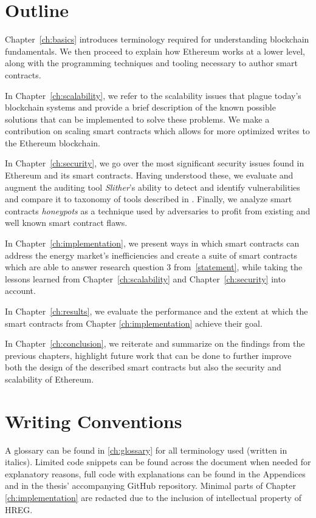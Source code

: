 \section{Outline}

Chapter~\ref{ch:basics} introduces terminology required for understanding blockchain fundamentals. We then proceed to explain how Ethereum works at a lower level, along with the programming techniques and tooling necessary to author smart contracts.

In Chapter~\ref{ch:scalability}, we refer to the scalability issues that plague today's blockchain systems and provide a brief description of the known possible solutions that can be implemented to solve these problems. We make a contribution on scaling smart contracts which allows for more optimized writes to the Ethereum blockchain.

In Chapter~\ref{ch:security}, we go over the most significant security issues found in Ethereum and its smart contracts. Having understood these, we evaluate and augment the auditing tool \textit{Slither}'s ability to detect and identify vulnerabilities and compare it to taxonomy of tools described in \cite{tools}. Finally, we analyze smart contracts \textit{honeypots} as a technique used by adversaries to profit from existing and well known smart contract flaws.

In Chapter~\ref{ch:implementation}, we present ways in which smart contracts can address the energy market's inefficiencies and create a suite of smart contracts which are able to answer research question 3 from~\ref{statement}, while taking the lessons learned from Chapter~\ref{ch:scalability} and Chapter~\ref{ch:security} into account.

In Chapter~\ref{ch:results}, we evaluate the performance and the extent at which the smart contracts from Chapter \ref{ch:implementation} achieve their goal. 

In Chapter~\ref{ch:conclusion}, we reiterate and summarize on the findings from the previous chapters, highlight future work that can be done to further improve both the design of the described smart contracts but also the security and scalability of Ethereum.

\section{Writing Conventions}
A glossary can be found in \ref{ch:glossary} for all terminology used (written in italics). Limited code snippets can be found across the document when needed for explanatory reasons, full code with explanations can be found in the Appendices and in the thesis' accompanying GitHub repository\@. Minimal parts of Chapter \ref{ch:implementation} are redacted due to the inclusion of intellectual property of HREG.

